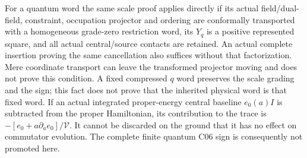 \documentclass[12pt,a4paper]{article}
\begin{document}
For a quantum word the same scale proof applies directly if its actual
field/dual-field, constraint, occupation projector and ordering are
conformally transported with a homogeneous grade-zero restriction word,
its $Y_q$ is a positive represented square, and all actual central/source
contacts are retained. An actual complete insertion proving the same
cancellation also suffices without that factorization. Mere coordinate
transport can leave the transformed projector moving and does not prove
this condition. A fixed compressed
$q$ word preserves the scale grading and the sign; this fact does not
prove that the inherited physical word is that fixed word. If an actual
integrated proper-energy central baseline $e_0(a)I$ is subtracted from the
proper Hamiltonian, its contribution to the trace is
$-[e_0+a\partial_a e_0]/\mathcal V$. It cannot be discarded on the
ground that it has no effect on commutator evolution. The complete finite
quantum C06 sign is consequently not promoted here.
\end{document}
